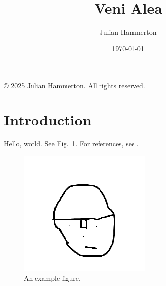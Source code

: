 \documentclass[11pt,a4paper]{article}
\title{Veni Alea}
\author{Julian Hammerton}
\date{\today}
\begin{document}
\maketitle

\vspace{1em}
\begin{center}
  {\small © 2025 Julian Hammerton. All rights reserved.}
\end{center}

\section{Introduction}
Hello, world. See Fig.~\ref{fig:example}. For references, see \textcite{knuth1984texbook}.

\begin{figure}[h]
  \centering
  \includegraphics[width=.5\linewidth]{figures/example.png}
  \caption{An example figure.}
  \label{fig:example}
\end{figure}

\printbibliography
\end{document}
